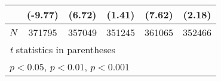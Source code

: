 \begin{table}[htbp]
\begin{tabular}{l*{5}{c}}
            &     (-9.77)         &      (6.72)         &      (1.41)         &      (7.62)         &      (2.18)         \\
\hline
\(N\)       &      371795         &      357049         &      351245         &      361065         &      352466         \\
\hline\hline
\multicolumn{6}{l}{\footnotesize \textit{t} statistics in parentheses}\\
\multicolumn{6}{l}{\footnotesize \sym{*} \(p<0.05\), \sym{**} \(p<0.01\), \sym{***} \(p<0.001\)}\\
\end{tabular}
\label{tab:oaxaca_female}
\end{table}
